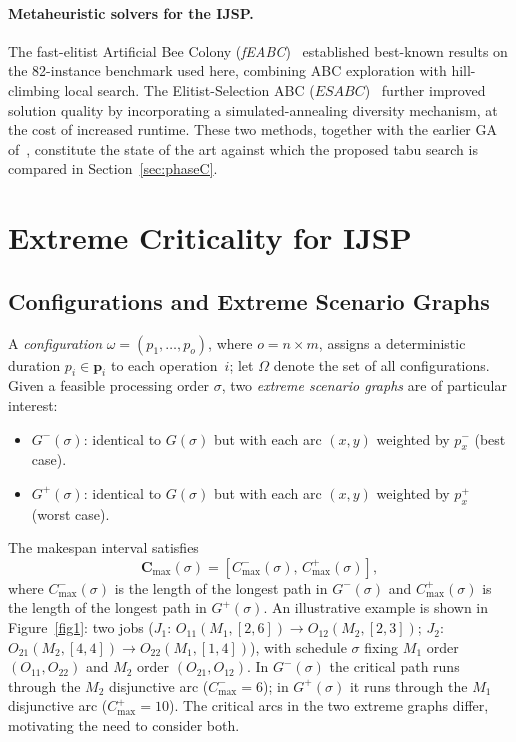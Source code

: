 \documentclass[preprint,12pt]{elsarticle}
\begin{document}
\paragraph{Metaheuristic solvers for the IJSP.}
The fast-elitist Artificial Bee Colony (\emph{fEABC})~\cite{DiazFEABC2023} established best-known results on the 82-instance benchmark used here, combining ABC exploration with hill-climbing local search. The Elitist-Selection ABC ($ESABC$)~\cite{DiazICAE2023} further improved solution quality by incorporating a simulated-annealing diversity mechanism, at the cost of increased runtime. These two methods, together with the earlier GA of~\cite{DiazIPMU2020}, constitute the state of the art against which the proposed tabu search is compared in Section~\ref{sec:phaseC}.


\section{Extreme Criticality for IJSP}
\label{sec:criticality}

\subsection{Configurations and Extreme Scenario Graphs}
\label{sec:configurations}

A \emph{configuration} $\omega = (p_1,\ldots,p_o)$, where $o = n \times m$, assigns a deterministic duration $p_i \in \mathbf{p}_i$ to each operation~$i$; let $\Omega$ denote the set of all configurations. Given a feasible processing order $\sigma$, two \emph{extreme scenario graphs} are of particular interest:
\begin{itemize}
\item $G^-(\sigma)$: identical to $G(\sigma)$ but with each arc $(x,y)$ weighted by $p_{x}^{-}$ (best case).
\item $G^+(\sigma)$: identical to $G(\sigma)$ but with each arc $(x,y)$ weighted by $p_{x}^{+}$ (worst case).
\end{itemize}
The makespan interval satisfies
\begin{equation}
\mathbf{C}_{\max}(\sigma) = [C^-_{\max}(\sigma),\, C^+_{\max}(\sigma)],
\end{equation}
where $C^-_{\max}(\sigma)$ is the length of the longest path in $G^-(\sigma)$ and $C^+_{\max}(\sigma)$ is the length of the longest path in $G^+(\sigma)$. An illustrative example is shown in Figure~\ref{fig1}: two jobs ($J_1$: $O_{11}(M_1,[2,6])\!\to\!O_{12}(M_2,[2,3])$; $J_2$: $O_{21}(M_2,[4,4])\!\to\!O_{22}(M_1,[1,4])$), with schedule $\sigma$ fixing $M_1$ order $(O_{11},O_{22})$ and $M_2$ order $(O_{21},O_{12})$. In $G^-(\sigma)$ the critical path runs through the $M_2$ disjunctive arc ($C^-_{\max}=6$); in $G^+(\sigma)$ it runs through the $M_1$ disjunctive arc ($C^+_{\max}=10$). The critical arcs in the two extreme graphs differ, motivating the need to consider both.
\end{document}
